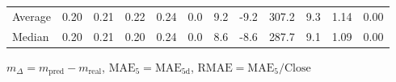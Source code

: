 \begin{threeparttable}
{\begin{tabular}{lrrrrrrrrrrr}
Average &          0.20 &          0.21 &          0.22 &        0.24 &                 0.0 &                 9.2 &       -9.2 &               307.2 &              9.3 &            1.14 &                   0.00 \\
 Median &          0.20 &          0.21 &          0.20 &        0.24 &                 0.0 &                 8.6 &       -8.6 &               287.7 &              9.1 &            1.09 &                   0.00 \\
\bottomrule
\end{tabular}
}
\begin{tablenotes}\footnotesize
\item $m_\Delta=m_{\text{pred}}-m_{\text{real}}$,
$\mathrm{MAE}_5=\mathrm{MAE}_{5\text{d}}$,
$\mathrm{RMAE}=\mathrm{MAE}_5/\text{Close}$
\end{tablenotes}
\end{threeparttable}
\endgroup

